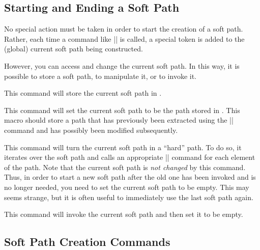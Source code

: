 \subsection{Starting and Ending a Soft Path}

No special action must be taken in order to start the creation of a
soft path. Rather, each time a command like |\pgfsyssoftpath@lineto|
is called, a special token is added to the (global) current soft path
being constructed.

However, you can access and change the current soft path. In this way,
it is possible to store a soft path, to manipulate it, or to invoke
it.

\begin{command}{\pgfsyssoftpath@getcurrentpath{}}
  This command will store the current soft path in .
\end{command}

\begin{command}{\pgfsyssoftpath@setcurrentpath{}}
  This command will set the current soft path to be the path stored in
  . This macro should store a path that has
  previously been extracted using the |\pgfsyssoftpath@getcurrentpath|
  command and has possibly been modified subsequently.
\end{command}

\begin{command}{\pgfsyssoftpath@invokecurrentpath}
  This command will turn the current soft path in a ``hard'' path. To
  do so, it iterates over the soft path and calls an appropriate
  |\pgfsys@xxxx| command for each element of the path. Note that the
  current soft path is \emph{not changed} by this command. Thus, in
  order to start a new soft path after the old one has been invoked
  and is no longer needed, you need to set the current soft path to be
  empty. This may seems strange, but it is often useful to immediately
  use the last soft path again.
\end{command}

\begin{command}{\pgfsyssoftpath@flushcurrentpath}
  This command will invoke the current soft path and then set it to be
  empty. 
\end{command}



\subsection{Soft Path Creation Commands}

